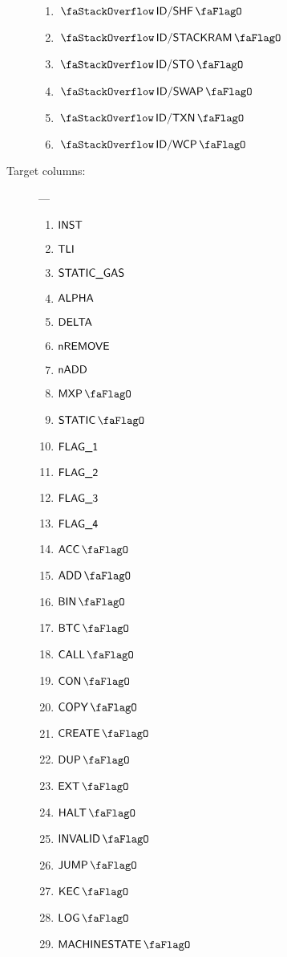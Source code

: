 \begin{description}
\begin{multicols}{3}
\begin{enumerate}
				\item $\stackDecShfFlag$
				\item $\stackDecStackRamFlag$
				\item $\stackDecStoFlag$
				\item $\stackDecSwapFlag$
				\item $\stackDecTxnFlag$
				\item $\stackDecWcpFlag$
			\end{enumerate}
		\end{multicols}
	\item[Target columns:] ---
		\begin{multicols}{3}
			\begin{enumerate}
				\item $\textsf{INST}$
				\item $\textsf{TLI}$
				\item $\textsf{STATIC\_GAS}$
				\item $\textsf{ALPHA}$
				\item $\textsf{DELTA}$
				\item $\textsf{nREMOVE}$
				\item $\textsf{nADD}$
				\item $\mxpFlag$
				\item $\staticFlag$
				\item $\textsf{FLAG\_1}$
				\item $\textsf{FLAG\_2}$
				\item $\textsf{FLAG\_3}$
				\item $\textsf{FLAG\_4}$
				\item $\accFlag$
				\item $\addFlag$
				\item $\binFlag$
				\item $\btcFlag$
				\item $\callFlag$
				\item $\conFlag$
				\item $\copyFlag$
				\item $\createFlag$
				\item $\dupFlag$
				\item $\extFlag$
				\item $\haltFlag$
				\item $\invalidFlag$
				\item $\jumpFlag$
				\item $\kecFlag$
				\item $\logFlag$
				\item $\machineStateFlag$

\end{enumerate}
\end{multicols}
\end{description}
